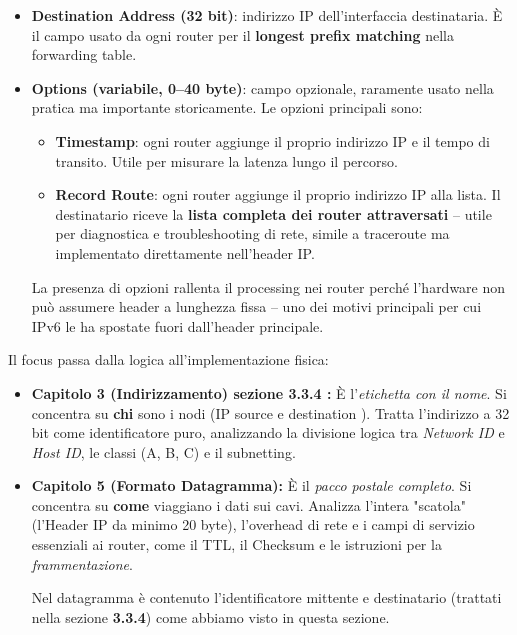 \documentclass[a4paper,12pt]{report}
\begin{document}
\begin{itemize}
\vspace{0.5cm}
\subsubsection*{Quinta riga}
    \item \textbf{Destination Address (32 bit)}: indirizzo IP
          dell'interfaccia destinataria. È il campo usato da ogni
          router per il \textbf{longest prefix matching} nella
          forwarding table.

    \item \textbf{Options (variabile, 0--40 byte)}: campo opzionale,
          raramente usato nella pratica ma importante storicamente.
          Le opzioni principali sono:
          \begin{itemize}
              \item \textbf{Timestamp}: ogni router aggiunge il
                    proprio indirizzo IP e il tempo di transito.
                    Utile per misurare la latenza lungo il percorso.
              \item \textbf{Record Route}: ogni router aggiunge il
                    proprio indirizzo IP alla lista. Il destinatario
                    riceve la \textbf{lista completa dei router
                    attraversati} -- utile per diagnostica e
                    troubleshooting di rete, simile a traceroute ma
                    implementato direttamente nell'header IP.
             
          \end{itemize}
          La presenza di opzioni rallenta il processing nei router
          perché l'hardware non può assumere header a lunghezza fissa
          -- uno dei motivi principali per cui IPv6 le ha spostate
          fuori dall'header principale.

\end{itemize}

\begin{collegamentobox}[title=�� Focus: IPv4 (Cap. 3) vs Datagramma IPv4 (Cap. 5)]
  Il focus passa dalla logica all'implementazione fisica:
  \begin{itemize}
      \item \textbf{Capitolo 3 (Indirizzamento) sezione 3.3.4 :} È l'\textit{etichetta con il nome}. Si concentra su \textbf{chi} sono i nodi (IP source e destination ). Tratta l'indirizzo a 32 bit come identificatore puro, analizzando la divisione logica tra \textit{Network ID} e \textit{Host ID}, le classi (A, B, C) e il subnetting.
      \item \textbf{Capitolo 5 (Formato Datagramma):} È il \textit{pacco postale completo}. Si concentra su \textbf{come} viaggiano i dati sui cavi. Analizza l'intera "scatola" (l'Header IP da minimo 20 byte), l'overhead di rete e i campi di servizio essenziali ai router, come il TTL, il Checksum e le istruzioni per la \textit{frammentazione}. 
      
      Nel datagramma è contenuto l'identificatore mittente e destinatario (trattati nella sezione \textbf{3.3.4}) come abbiamo visto in questa sezione.
  \end{itemize}
\end{collegamentobox}
\end{document}

